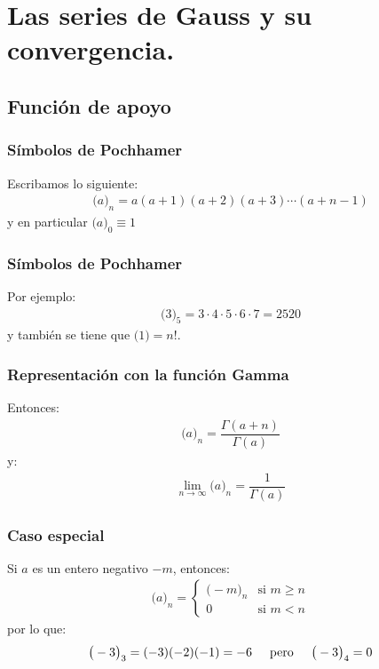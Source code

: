 \documentclass[12pt]{beamer}
\begin{document}
\section{Las series de Gauss y su convergencia.}
\subsection{Función de apoyo}

\begin{frame}
\frametitle{Símbolos de Pochhamer}
Escribamos lo siguiente:
\pause
\begin{align}
\big( a \big)_{n} = a ( a + 1)(a + 2)(a + 3) \cdots (a + n - 1)
\label{eq:ecuacion_01_01_01_01}
\end{align}
y en particular $\big( a \big)_{0} \equiv 1$
\end{frame}
\begin{frame}
\frametitle{Símbolos de Pochhamer}
Por ejemplo:
\pause
\begin{align*}
\big( 3 \big)_{5} = 3 \cdot 4 \cdot 5 \cdot 6 \cdot 7 = 2520
\end{align*}
\pause
y también se tiene que $\big( 1 \big) = n!$.
\end{frame}
\begin{frame}
\frametitle{Representación con la función Gamma}
Entonces:
\pause
\begin{align}
\big( a \big)_{n} = \dfrac{\Gamma (a + n)}{\Gamma (a)}
\label{eq:ecuacion_01_01_01_02}
\end{align}
y: 
\pause
\begin{align}
\lim_{n \to \infty} \big( a \big)_{n} = \dfrac{1}{\Gamma (a)}
\label{eq:ecuacion_01_01_01_03}
\end{align}
\end{frame}
\begin{frame}
\frametitle{Caso especial}
Si $a$ es un entero negativo $-m$, entonces:
\pause
\begin{align*}
\big( a \big)_{n} = \begin{cases}
\big( -m \big)_{n} & \mbox{si } m \geq n \\
0 & \mbox{si } m < n
\end{cases}
\end{align*}
por lo que: \pause
\begin{align*}
\big( -3 \big)_{3} = (-3)(-2)(-1) = -6 \hspace{0.5cm} \mbox{pero} \hspace{0.5cm} \big( -3 \big)_{4} = 0
\end{align*}
\end{frame}
\end{document}
